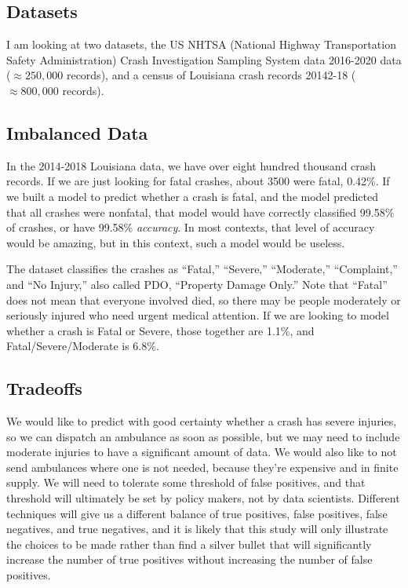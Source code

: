 \subsection{Datasets}

I am looking at two datasets,  the US NHTSA (National Highway Transportation Safety Administration) Crash Investigation Sampling System data 2016-2020 data ($\approx 250,000$ records), and a census of Louisiana crash records 20142-18 ($\approx 800,000$ records).

\subsection{Imbalanced Data}

In the 2014-2018 Louisiana data, we have over eight hundred thousand crash records.  If we are just looking for fatal crashes, about 3500 were fatal, 0.42\%.  If we built a model to predict whether a crash is fatal, and the model predicted that all crashes were nonfatal, that model would have correctly classified 99.58\% of crashes, or have 99.58\% {\it accuracy}.  In most contexts, that level of accuracy would be amazing, but in this context, such a model would be useless.  

The dataset classifies the crashes as ``Fatal,'' ``Severe,'' ``Moderate,'' ``Complaint,'' and ``No Injury,'' also called PDO, ``Property Damage Only.''  Note that ``Fatal'' does not mean that everyone involved died, so there may be people moderately or seriously injured who need urgent medical attention.  If we are looking to model whether a crash is Fatal or Severe, those together are 1.1\%, and Fatal/Severe/Moderate is 6.8\%.  

\subsection{Tradeoffs}

We would like to predict with good certainty whether a crash has severe injuries, so we can dispatch an ambulance as soon as possible, but we may need to include moderate injuries to have a significant amount of data. We would also like to not send ambulances where one is not needed, because they're expensive and in finite supply.  We will need to tolerate some threshold of false positives, and that threshold will ultimately be set by policy makers, not by data scientists.  Different techniques will give us a different balance of true positives, false positives, false negatives, and true negatives, and it is likely that this study will only illustrate the choices to be made rather than find a silver bullet that will significantly increase the number of true positives without increasing the number of false positives.  


